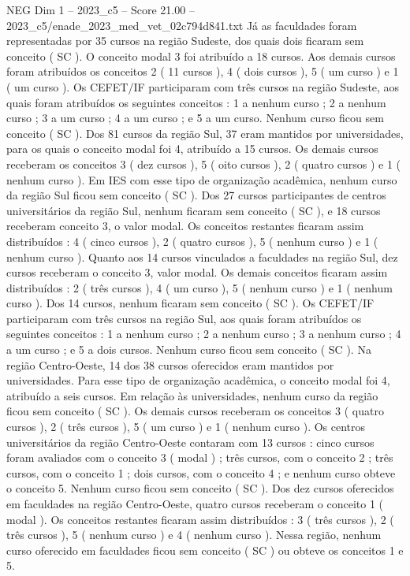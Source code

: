 \begin{textsample}{NEG Dim 1 – 2023\_c5 – Score 21.00 – 2023\_c5/enade\_2023\_med\_vet\_02c794d841.txt}
Já as faculdades foram representadas por 35 cursos na região Sudeste, dos quais dois ficaram sem conceito ( SC ).
O conceito modal 3 foi atribuído a 18 cursos.
Aos demais cursos foram atribuídos os conceitos 2 ( 11 cursos ), 4 ( dois cursos ), 5 ( um curso ) e 1 ( um curso ).
Os CEFET/IF participaram com três cursos na região Sudeste, aos quais foram atribuídos os seguintes conceitos : 1 a nenhum curso ; 2 a nenhum curso ; 3 a um curso ; 4 a um curso ; e 5 a um curso.
Nenhum curso ficou sem conceito ( SC ).
Dos 81 cursos da região Sul, 37 eram mantidos por universidades, para os quais o conceito modal foi 4, atribuído a 15 cursos.
Os demais cursos receberam os conceitos 3 ( dez cursos ), 5 ( oito cursos ), 2 ( quatro cursos ) e 1 ( nenhum curso ).
Em IES com esse tipo de organização acadêmica, nenhum curso da região Sul ficou sem conceito ( SC ).
Dos 27 cursos participantes de centros universitários da região Sul, nenhum ficaram sem conceito ( SC ), e 18 cursos receberam conceito 3, o valor modal.
Os conceitos restantes ficaram assim distribuídos : 4 ( cinco cursos ), 2 ( quatro cursos ), 5 ( nenhum curso ) e 1 ( nenhum curso ).
Quanto aos 14 cursos vinculados a faculdades na região Sul, dez cursos receberam o conceito 3, valor modal.
Os demais conceitos ficaram assim distribuídos : 2 ( três cursos ), 4 ( um curso ), 5 ( nenhum curso ) e 1 ( nenhum curso ).
Dos 14 cursos, nenhum ficaram sem conceito ( SC ).
Os CEFET/IF participaram com três cursos na região Sul, aos quais foram atribuídos os seguintes conceitos : 1 a nenhum curso ; 2 a nenhum curso ; 3 a nenhum curso ; 4 a um curso ; e 5 a dois cursos.
Nenhum curso ficou sem conceito ( SC ).
Na região Centro-Oeste, 14 dos 38 cursos oferecidos eram mantidos por universidades.
Para esse tipo de organização acadêmica, o conceito modal foi 4, atribuído a seis cursos.
Em relação às universidades, nenhum curso da região ficou sem conceito ( SC ).
Os demais cursos receberam os conceitos 3 ( quatro cursos ), 2 ( três cursos ), 5 ( um curso ) e 1 ( nenhum curso ).
Os centros universitários da região Centro-Oeste contaram com 13 cursos : cinco cursos foram avaliados com o conceito 3 ( modal ) ; três cursos, com o conceito 2 ; três cursos, com o conceito 1 ; dois cursos, com o conceito 4 ; e nenhum curso obteve o conceito 5.
Nenhum curso ficou sem conceito ( SC ).
Dos dez cursos oferecidos em faculdades na região Centro-Oeste, quatro cursos receberam o conceito 1 ( modal ).
Os conceitos restantes ficaram assim distribuídos : 3 ( três cursos ), 2 ( três cursos ), 5 ( nenhum curso ) e 4 ( nenhum curso ).
Nessa região, nenhum curso oferecido em faculdades ficou sem conceito ( SC ) ou obteve os conceitos 1 e 5.

\end{textsample}

